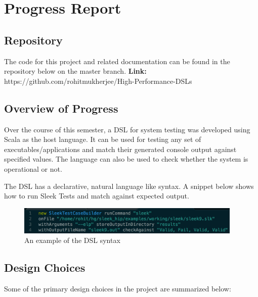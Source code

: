\documentclass[12 pt]{article}
\begin{document}
\section{Progress Report}

\subsection{Repository}
The code for this project and related documentation can be found in the repository below on the master branch.\newline
\textbf{Link:} https://github.com/rohitmukherjee/High-Performance-DSLs

\subsection{Overview of Progress}
Over the course of this semester, a DSL for system testing was developed using Scala as the host language. It can be used for testing any set of executables/applications and match their generated console output against specified values. The language can also be used to check whether the system is operational or not.
\bigskip

\noindent
The DSL has a declarative, natural language like syntax. A snippet below shows how to run Sleek Tests and match against expected output.

\begin{figure}[h!]
  \centering
    \includegraphics[height=50px]{figures/code_snippet_1.png}
  \caption{An example of the DSL syntax}
\end{figure}

\subsection{Design Choices}

Some of the primary design choices in the project are summarized below:
\end{document}
